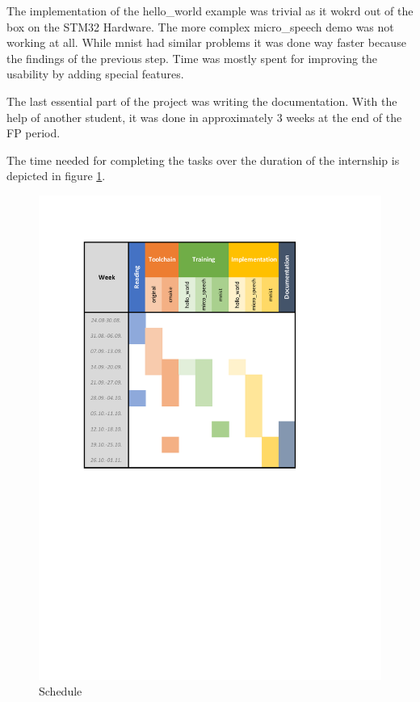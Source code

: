 \documentclass[oneside]{tum-book}
\begin{document}
The implementation of the hello\_world example was trivial as it wokrd out of the box on the STM32 Hardware. The more complex micro\_speech demo was not working at all. While mnist had similar problems it was done way faster because the findings of the previous step. Time was mostly spent for improving the usability by adding special features.

The last essential part of the project was writing the documentation. With the help of another student, it was done in approximately 3 weeks at the end of the FP period.

The time needed for completing the tasks over the duration of the internship is depicted in figure \ref{fig:schedule}.

\begin{figure}[h]
\centering
\includegraphics[scale=0.9]{figures/fp_report_plan.pdf}
\caption{Schedule}
\label{fig:schedule}
\end{figure}
\end{document}
